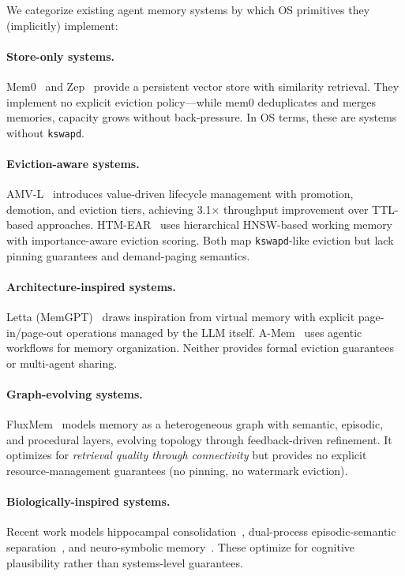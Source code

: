 \documentclass[10pt,twocolumn]{article}
\begin{document}
We categorize existing agent memory systems by which OS primitives they (implicitly) implement:

\paragraph{Store-only systems.} Mem0~\cite{mem0} and Zep~\cite{zep2024} provide a persistent vector store with similarity retrieval. They implement no explicit eviction policy---while mem0 deduplicates and merges memories, capacity grows without back-pressure. In OS terms, these are systems without \texttt{kswapd}.

\paragraph{Eviction-aware systems.} AMV-L~\cite{amvl2026} introduces value-driven lifecycle management with promotion, demotion, and eviction tiers, achieving 3.1$\times$ throughput improvement over TTL-based approaches. HTM-EAR~\cite{htmear2026} uses hierarchical HNSW-based working memory with importance-aware eviction scoring. Both map \texttt{kswapd}-like eviction but lack pinning guarantees and demand-paging semantics.

\paragraph{Architecture-inspired systems.} Letta (MemGPT)~\cite{memgpt2023} draws inspiration from virtual memory with explicit page-in/page-out operations managed by the LLM itself. A-Mem~\cite{amem2025} uses agentic workflows for memory organization. Neither provides formal eviction guarantees or multi-agent sharing.

\paragraph{Graph-evolving systems.} FluxMem~\cite{fluxmem2026} models memory as a heterogeneous graph with semantic, episodic, and procedural layers, evolving topology through feedback-driven refinement. It optimizes for \emph{retrieval quality through connectivity} but provides no explicit resource-management guarantees (no pinning, no watermark eviction).

\paragraph{Biologically-inspired systems.} Recent work models hippocampal consolidation~\cite{humaninspired2026}, dual-process episodic-semantic separation~\cite{episodicsemantic2026}, and neuro-symbolic memory~\cite{neusymms2026}. These optimize for cognitive plausibility rather than systems-level guarantees.
\end{document}
